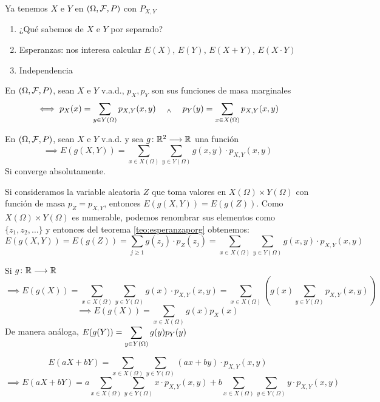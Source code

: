 Ya tenemos $X$ e $Y$ en $(\Omega, \mathcal{F}, P)$ con $P_{X,Y}$
\begin{enumerate}[topsep=1pt, itemsep=1pt,parsep=3pt]
	\item ¿Qué sabemos de $X$ e $Y$ por separado?
	\item Esperanzas: nos interesa calcular $E(X)$, $E(Y)$, $E(X+Y)$, $E(X\cdot Y)$
	\item Independencia
\end{enumerate}
\begin{defn}
	En $(\Omega, \mathcal{F}, P)$, sean $X$ e $Y$ v.a.d., $p_{X}, p_{Y}$ son sus funciones de masa marginales
	\[\iff p_X(x)=\sum_{y\in Y(\Omega)} p_{X, Y} (x, y) \quad\; _{\wedge} \;\quad p_Y(y)=\sum_{x\in X(\Omega)} p_{X, Y} (x, y)\]
\end{defn}

\begin{teo}
	En $(\Omega, \mathcal{F}, P)$, sean $X$ e $Y$ v.a.d. y sea $g \colon \mathbb{R}^2 \longrightarrow \mathbb{R}$ una función
	\[\implies E(g(X, Y))=\sum_{x\in X(\Omega)} \sum_{y\in Y(\Omega)} g(x, y) \cdot p_{X,Y}(x,y)\]
	Si converge absolutamente.
	\begin{dem}
		Si consideramos la variable aleatoria $Z$ que toma valores en $X(\Omega)\times Y(\Omega)$ con función de masa $p_Z = p_{X,Y}$, entonces $E(g(X, Y))=E(g(Z))$. Como $X(\Omega)\times Y(\Omega)$ es numerable, podemos renombrar sus elementos como $\{z_1, z_2, \dots\}$ y entonces del teorema \ref{teo:esperanzaporg} obtenemos:
		\[E(g(X, Y))=E(g(Z))=\sum_{j\geq 1} g(z_j)\cdot p_Z(z_j) = \sum_{x\in X(\Omega)} \sum_{y\in Y(\Omega)} g(x, y) \cdot p_{X,Y}(x,y)\]
	\end{dem}
\end{teo}

\begin{obs}
	Si $g \colon \mathbb{R} \longrightarrow \mathbb{R}$
	\[\implies E(g(X)) = \sum_{x\in X(\Omega)} \sum_{y\in Y(\Omega)} g(x) \cdot p_{X,Y}(x,y) = \sum_{x\in X(\Omega)} \left(g(x)\sum_{y\in Y(\Omega)}p_{X,Y}(x,y)\right)\]
	\[\implies E(g(X))=\sum_{x\in X(\Omega)} g(x) p_X(x)\]
	De manera análoga, $\displaystyle E(g(Y))=\sum_{y\in Y(\Omega)} g(y) p_Y(y)$
\end{obs}

\begin{ejem}[$E(aX+bY)=aE(X)+bE(Y)$]
	\[E(aX+bY)=\sum_{x\in X(\Omega)} \sum_{y\in Y(\Omega)} (ax+by)\cdot p_{X,Y}(x,y)\]
	\[\implies E(aX+bY)=a\sum_{x\in X(\Omega)} \sum_{y\in Y(\Omega)} x\cdot p_{X,Y}(x,y) + b\sum_{x\in X(\Omega)} \sum_{y\in Y(\Omega)} y\cdot p_{X,Y}(x,y)\]
\end{ejem}

